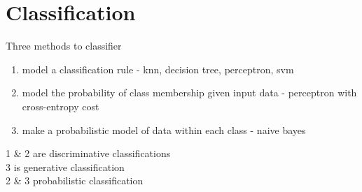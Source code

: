 \documentclass{beamer}
\begin{document}
\section{Classification}
\begin{frame}
	Three methods to classifier
	\begin{enumerate}
		\item model a classification rule - knn, decision tree, perceptron, svm
		\item model the probability of class membership given input data - perceptron with cross-entropy cost
		\item make a probabilistic model of data within each class - naive bayes\\
	\end{enumerate}
1 \& 2 are discriminative classifications\\
3 is generative classification\\
2 \& 3 probabilistic classification

\end{frame}
\end{document}
